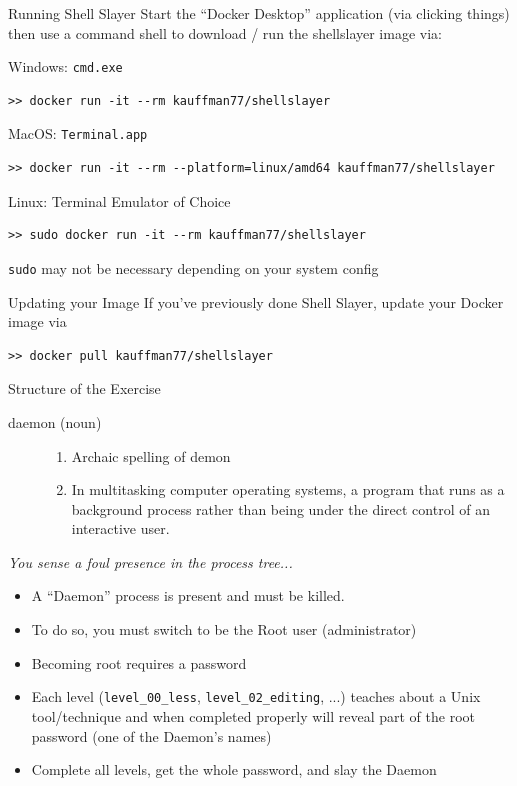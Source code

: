 \documentclass[mathserif]{beamer}
\begin{document}
\begin{frame}[label={sec:org2c90135},fragile]{Running Shell Slayer}
 Start the ``Docker Desktop'' application (via clicking things) then use
a command shell to download / run the shellslayer image via:

\footnotesize
\begin{block}{Windows: \texttt{cmd.exe}}
\begin{verbatim}
>> docker run -it --rm kauffman77/shellslayer
\end{verbatim}
\end{block}
\begin{block}{MacOS: \texttt{Terminal.app}}
\begin{verbatim}
>> docker run -it --rm --platform=linux/amd64 kauffman77/shellslayer
\end{verbatim}
\end{block}
\begin{block}{Linux: Terminal Emulator of Choice}
\begin{verbatim}
>> sudo docker run -it --rm kauffman77/shellslayer
\end{verbatim}
\texttt{sudo} may not be necessary depending on your system config
\end{block}
\begin{block}{Updating your Image}
If you've previously done Shell Slayer, update your Docker image via
\begin{verbatim}
>> docker pull kauffman77/shellslayer
\end{verbatim}
\end{block}
\end{frame}
\begin{frame}[label={sec:org65353ae},fragile]{Structure of the Exercise}
 \begin{description}
\item[{daemon (noun)}] \begin{enumerate}
\item Archaic spelling of demon
\item In multitasking computer operating systems, a program that runs
as a background process rather than being under the direct
control of an interactive user.
\end{enumerate}
\end{description}

\normalsize
\emph{You sense a foul presence in the process tree...}
\begin{itemize}
\item A ``Daemon'' process is present and must be killed.
\item To do so, you must switch to be the Root user (administrator)
\item Becoming root requires a password
\item Each level (\texttt{level\_00\_less}, \texttt{level\_02\_editing}, ...) teaches about
a Unix tool/technique and when completed properly will reveal part
of the root password (one of the Daemon's names)
\item Complete all levels, get the whole password, and slay the
Daemon
\end{itemize}
\end{frame}
\end{document}
